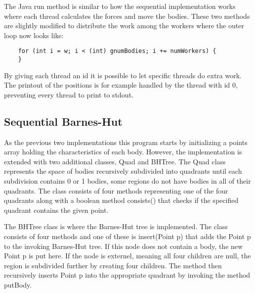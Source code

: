 \documentclass{article}
\begin{document}
The Java run method is similar to how the sequential implementation works where each thread calculates the forces and move the bodies. These two methods are slightly modified to distribute the work among the workers where the outer loop now looks like: \begin{verbatim}
    for (int i = w; i < (int) gnumBodies; i += numWorkers) {
    }
\end{verbatim}{}

By giving each thread an id it is possible to let specific threads do extra work. The printout of the positions is for example handled by the thread with id 0, preventing every thread to print to stdout. 

\subsection{Sequential Barnes-Hut}

As the previous two implementations this program starts by initializing a points array holding the characteristics of each body. However, the implementation is extended with two additional classes, Quad and BHTree. The Quad class represents the space of bodies recursively subdivided into quadrants until each subdivision contains 0 or 1 bodies, some regions do not have bodies in all of their quadrants. The class consists of four methods representing one of the four quadrants along with a boolean method consists() that checks if the specified quadrant contains the given point.  

The BHTree class is where the Barnes-Hut tree is implemented. The class consists of four methods and one of these is insert(Point p) that adds the Point p to the invoking Barnes-Hut tree. If this node does not contain a body, the new Point p is put here. If the node is externel, meaning all four children are null, the region is subdivided further by creating four children. The method then recursively inserts Point p into the appropriate quadrant by invoking the method putBody.
\end{document}
